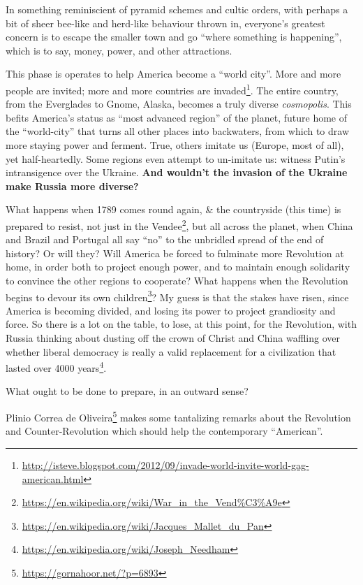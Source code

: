 In something reminiscient of pyramid schemes and cultic orders, with perhaps a bit of sheer bee-like and herd-like behaviour thrown in, everyone's greatest concern is to escape the smaller town and go ``where something is happening'', which is to say, money, power, and other attractions.

This phase is operates to help America become a ``world city''. More and more people are invited; more and more countries are invaded\footnote{\url{http://isteve.blogspot.com/2012/09/invade-world-invite-world-gag-american.html}}. The entire country, from the Everglades to Gnome, Alaska, becomes a truly diverse \emph{cosmopolis}. This befits America's status as ``most advanced region'' of the planet, future home of the ``world-city'' that turns all other places into backwaters, from which to draw more staying power and ferment. True, others imitate us (Europe, most of all), yet half-heartedly. Some regions even attempt to un-imitate us: witness Putin's intransigence over the Ukraine. \textbf{And wouldn't the invasion of the Ukraine make Russia more diverse?}

What happens when 1789 comes round again, \& the countryside (this time) is prepared to resist, not just in the Vendee\footnote{\url{https://en.wikipedia.org/wiki/War_in_the_Vend\%C3\%A9e}}, but all across the planet, when China and Brazil and Portugal all say ``no'' to the unbridled spread of the end of history? Or will they? Will America be forced to fulminate more Revolution at home, in order both to project enough power, and to maintain enough solidarity to convince the other regions to cooperate? What happens when the Revolution begins to devour its own children\footnote{\url{https://en.wikipedia.org/wiki/Jacques_Mallet_du_Pan}}? My guess is that the stakes have risen, since America is becoming divided, and losing its power to project grandiosity and force. So there is a lot on the table, to lose, at this point, for the Revolution, with Russia thinking about dusting off the crown of Christ and China waffling over whether liberal democracy is really a valid replacement for a civilization that lasted over 4000 years\footnote{\url{https://en.wikipedia.org/wiki/Joseph_Needham}}.

What ought to be done to prepare, in an outward sense?

Plinio Correa de Oliveira\footnote{\url{https://gornahoor.net/?p=6893}} makes some tantalizing remarks about the Revolution and Counter-Revolution which should help the contemporary ``American''.

